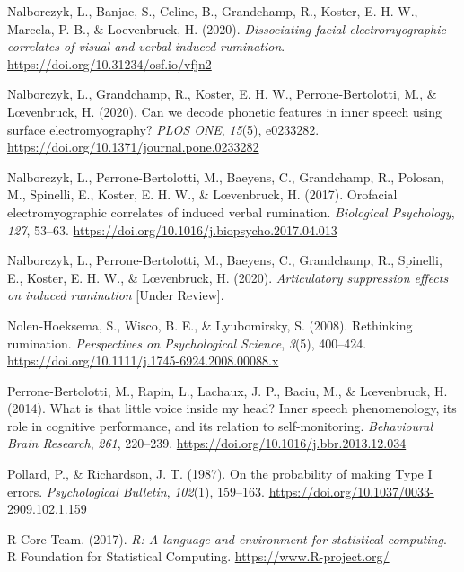 \documentclass[
  english,
  man, donotrepeattitle,floatsintext]{apa6}
\newlength{\cslhangindent}
\newenvironment{cslreferences}%
  {\setlength{\parindent}{0pt}%
  \everypar{\setlength{\hangindent}{\cslhangindent}}\ignorespaces}%
  {\par}
\begin{document}
\begin{cslreferences}
\leavevmode\hypertarget{ref-nalborczyk_dissociating_2020}{}%
Nalborczyk, L., Banjac, S., Celine, B., Grandchamp, R., Koster, E. H. W., Marcela, P.-B., \& Loevenbruck, H. (2020). \emph{Dissociating facial electromyographic correlates of visual and verbal induced rumination}. \url{https://doi.org/10.31234/osf.io/vfjn2}

\leavevmode\hypertarget{ref-nalborczyk_can_2020}{}%
Nalborczyk, L., Grandchamp, R., Koster, E. H. W., Perrone-Bertolotti, M., \& Lœvenbruck, H. (2020). Can we decode phonetic features in inner speech using surface electromyography? \emph{PLOS ONE}, \emph{15}(5), e0233282. \url{https://doi.org/10.1371/journal.pone.0233282}

\leavevmode\hypertarget{ref-nalborczyk_orofacial_2017}{}%
Nalborczyk, L., Perrone-Bertolotti, M., Baeyens, C., Grandchamp, R., Polosan, M., Spinelli, E., Koster, E. H. W., \& Lœvenbruck, H. (2017). Orofacial electromyographic correlates of induced verbal rumination. \emph{Biological Psychology}, \emph{127}, 53--63. \url{https://doi.org/10.1016/j.biopsycho.2017.04.013}

\leavevmode\hypertarget{ref-nalborczyk_articulatory_2020}{}%
Nalborczyk, L., Perrone-Bertolotti, M., Baeyens, C., Grandchamp, R., Spinelli, E., Koster, E. H. W., \& Lœvenbruck, H. (2020). \emph{Articulatory suppression effects on induced rumination} {[}Under Review{]}.

\leavevmode\hypertarget{ref-Nolen-Hoeksema2008}{}%
Nolen-Hoeksema, S., Wisco, B. E., \& Lyubomirsky, S. (2008). Rethinking rumination. \emph{Perspectives on Psychological Science}, \emph{3}(5), 400--424. \url{https://doi.org/10.1111/j.1745-6924.2008.00088.x}

\leavevmode\hypertarget{ref-perrone-bertolotti_what_2014}{}%
Perrone-Bertolotti, M., Rapin, L., Lachaux, J. P., Baciu, M., \& Lœvenbruck, H. (2014). What is that little voice inside my head? Inner speech phenomenology, its role in cognitive performance, and its relation to self-monitoring. \emph{Behavioural Brain Research}, \emph{261}, 220--239. \url{https://doi.org/10.1016/j.bbr.2013.12.034}

\leavevmode\hypertarget{ref-pollard_probability_1987}{}%
Pollard, P., \& Richardson, J. T. (1987). On the probability of making Type I errors. \emph{Psychological Bulletin}, \emph{102}(1), 159--163. \url{https://doi.org/10.1037/0033-2909.102.1.159}

\leavevmode\hypertarget{ref-R-base}{}%
R Core Team. (2017). \emph{R: A language and environment for statistical computing}. R Foundation for Statistical Computing. \url{https://www.R-project.org/}


\end{cslreferences}
\end{document}
